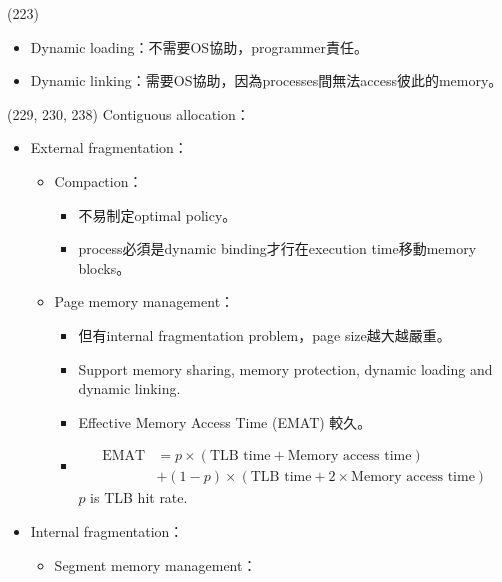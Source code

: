 \begin{theorem}{(223)} \quad\quad \begin{itemize}
        \item Dynamic loading：不需要OS協助，programmer責任。
        \item Dynamic linking：需要OS協助，因為processes間無法access彼此的memory。
    \end{itemize}
\end{theorem}

\begin{theorem}{(229, 230, 238)} Contiguous allocation：\begin{itemize}
        \item External fragmentation：\begin{itemize}
            \item Compaction：\begin{itemize}
                \item 不易制定optimal policy。
                \item process必須是dynamic binding才行在execution time移動memory blocks。
            \end{itemize}
            \item Page memory management：\begin{itemize}
                \item 但有internal fragmentation problem，page size越大越嚴重。
                \item Support memory sharing, memory protection, dynamic loading and dynamic linking.
                \item Effective Memory Access Time (EMAT) 較久。
                \item \begin{equation}
                    \begin{aligned}
                        \text{EMAT} & = p \times (\text{TLB time} + \text{Memory access time}) \\
                        & + (1 - p) \times (\text{TLB time} + 2 \times \text{Memory access time})
                    \end{aligned}
                \end{equation} $p$ is TLB hit rate.
            \end{itemize}
        \end{itemize}
        \item Internal fragmentation：\begin{itemize}
            \item Segment memory management：\begin{itemize}

\end{itemize}
\end{itemize}
\end{itemize}
\end{theorem}
